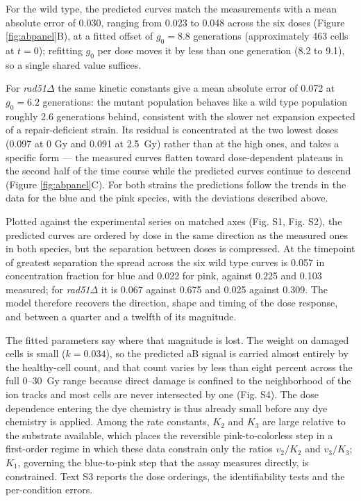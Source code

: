 \documentclass{asmarticle}
\begin{document}
For the wild type, the predicted curves match the measurements with a mean absolute error of 0.030, ranging from 0.023 to 0.048 across the six doses (Figure \ref{fig:abpanel}B), at a fitted offset of $g_0 = 8.8$ generations (approximately 463 cells at $t = 0$); refitting $g_0$ per dose moves it by less than one generation (8.2 to 9.1), so a single shared value suffices.

For \textit{rad51}$\Delta$ the same kinetic constants give a mean absolute error of 0.072 at $g_0 = 6.2$ generations: the mutant population behaves like a wild type population roughly 2.6 generations behind, consistent with the slower net expansion expected of a repair-deficient strain. Its residual is concentrated at the two lowest doses (0.097 at 0 Gy and 0.091 at 2.5~Gy) rather than at the high ones, and takes a specific form --- the measured curves flatten toward dose-dependent plateaus in the second half of the time course while the predicted curves continue to descend (Figure \ref{fig:abpanel}C). For both strains the predictions follow the trends in the data for the blue and the pink species, with the deviations described above.

Plotted against the experimental series on matched axes (Fig. S1, Fig. S2), the predicted curves are ordered by dose in the same direction as the measured ones in both species, but the separation between doses is compressed. At the timepoint of greatest separation the spread across the six wild type curves is 0.057 in concentration fraction for blue and 0.022 for pink, against 0.225 and 0.103 measured; for \textit{rad51}$\Delta$ it is 0.067 against 0.675 and 0.025 against 0.309. The model therefore recovers the direction, shape and timing of the dose response, and between a quarter and a twelfth of its magnitude.

The fitted parameters say where that magnitude is lost. The weight on damaged cells is small ($k = 0.034$), so the predicted aB signal is carried almost entirely by the healthy-cell count, and that count varies by less than eight percent across the full 0--30~Gy range because direct damage is confined to the neighborhood of the ion tracks and most cells are never intersected by one (Fig. S4). The dose dependence entering the dye chemistry is thus already small before any dye chemistry is applied. Among the rate constants, $K_2$ and $K_3$ are large relative to the substrate available, which places the reversible pink-to-colorless step in a first-order regime in which these data constrain only the ratios $v_2/K_2$ and $v_3/K_3$; $K_1$, governing the blue-to-pink step that the assay measures directly, is constrained. Text S3 reports the dose orderings, the identifiability tests and the per-condition errors.
\end{document}
